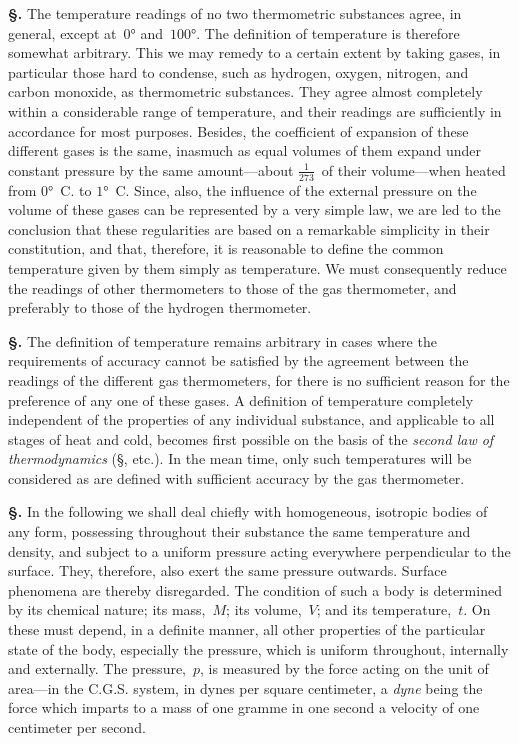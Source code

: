 \documentclass[12pt]{book}[2005/09/16]
\newcommand{\Section}[1]{
  \medskip\par\textbf{§\;#1}
  \label{section:#1}
}
\newcommand{\SecRef}[2][§\;]{\hyperref[section:#2.]{{\upshape #1#2}}}
\newcommand{\PageSep}[1]{\ignorespaces}
\begin{document}
\Section{4.} The temperature readings of no two thermometric
%
substances agree, in general, except at~$0°$ and~$100°$. The
definition of temperature is therefore somewhat arbitrary.
This we may remedy to a certain extent by taking gases, in
particular those hard to condense, such as hydrogen, oxygen,
nitrogen, and carbon monoxide, as thermometric substances.
They agree almost completely within a considerable range
of temperature, and their readings are sufficiently in accordance
for most purposes. Besides, the coefficient of expansion
of these different gases is the same, inasmuch as equal
volumes of them expand under constant pressure by the
same amount---about $\frac{1}{273}$~of their volume---when heated
from $0°$~C. to $1°$~C\@. Since, also, the influence of the external
pressure on the volume of these gases can be represented by
a very simple law, we are led to the conclusion that these
regularities are based on a remarkable simplicity in their
constitution, and that, therefore, it is reasonable to define
the common temperature given by them simply as temperature.
We must consequently reduce the readings of other
thermometers to those of the gas thermometer, and preferably
%
%
to those of the hydrogen thermometer.

\Section{5.} The definition of temperature remains arbitrary in
cases where the requirements of accuracy cannot be satisfied
by the agreement between the readings of the different
gas thermometers, for there is no sufficient reason for the
preference of any one of these gases. A definition of temperature
completely independent of the properties of any
individual substance, and applicable to all stages of heat
and cold, becomes first possible on the basis of the \emph{second
law of thermodynamics} (\SecRef{160}, etc.). In the mean time, only
such temperatures will be considered as are defined with
sufficient accuracy by the gas thermometer.

\Section{6.} In the following we shall deal chiefly with homogeneous,
isotropic bodies of any form, possessing throughout
%
their substance the same temperature and density, and
subject to a uniform pressure acting everywhere perpendicular
to the surface. They, therefore, also exert the same
\PageSep{4}
pressure outwards. Surface phenomena are thereby disregarded.
The condition of such a body is determined by
its chemical nature; its mass,~$M$; its volume,~$V$; and its
temperature,~$t$. On these must depend, in a definite manner,
all other properties of the particular state of the body,
especially the pressure, which is uniform throughout, internally
and externally. The pressure,~$p$, is measured by the
force acting on the unit of area---in the C.G.S. system, in
dynes per square centimeter, a \emph{dyne} being the force which
%
imparts to a mass of one gramme in one second a velocity
of one centimeter per second.
\end{document}
